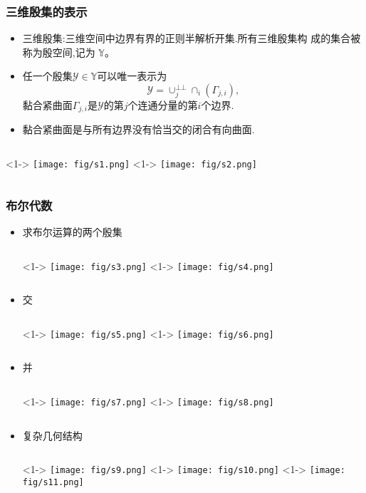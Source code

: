 \documentclass[UTF8]{ctexbeamer}	%
\theoremstyle{plain}
\theoremstyle{definition}
\theoremstyle{remark}
\numberwithin{equation}{section}
\begin{document}
\begin{frame}
    \frametitle{三维殷集的表示}
    \begin{itemize}
        \item 三维殷集:三维空间中边界有界的正则半解析开集.所有三维殷集构
        成的集合被称为殷空间,记为 $\mathbb{Y}$。
        \item 任一个殷集$\mathcal{Y} \in \mathbb{Y}$可以唯一表示为
        \[\mathcal{Y} = \cup_j^{\bot \bot} \cap_i (\Gamma_{j, i}),\]
        黏合紧曲面$\Gamma_{j, i}$是$\mathcal{Y}$的第$j$个连通分量的第$i$个边界.
        \item 黏合紧曲面是与所有边界没有恰当交的闭合有向曲面.
    \end{itemize}
    \begin{columns}
        <1->
            \texttt{[image: fig/s1.png]}
        <1->
        \texttt{[image: fig/s2.png]}
    \end{columns}
\end{frame}

\begin{frame}
    \frametitle{布尔代数}
    \begin{itemize}
        \item 求布尔运算的两个殷集
        \begin{columns}
            <1->
                \texttt{[image: fig/s3.png]}
            <1->
            \texttt{[image: fig/s4.png]}
        \end{columns}
        \item 交
        \begin{columns}
            <1->
                \texttt{[image: fig/s5.png]}
            <1->
            \texttt{[image: fig/s6.png]}
        \end{columns}
    \end{itemize}
\end{frame}

\begin{frame}
    \begin{itemize}
        \item 并 \begin{columns}
            <1->
                \texttt{[image: fig/s7.png]}
            <1->
            \texttt{[image: fig/s8.png]}
        \end{columns}
        \item 复杂几何结构
        \begin{columns}
            <1->
                \texttt{[image: fig/s9.png]}
            <1->
            \texttt{[image: fig/s10.png]}
            <1->
            \texttt{[image: fig/s11.png]}
        \end{columns}
    \end{itemize}
\end{frame}
\end{document}
